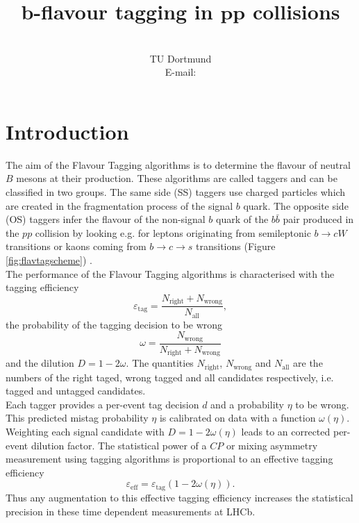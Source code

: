 \documentclass{PoS}
\title{$\bm{b}$-flavour tagging in $\bm{p\!p}$ collisions}
\author{\speaker{Alex Birnkraut}\\%
        TU Dortmund\\
        E-mail: \email{a.birnkraut@cern.ch}}
\begin{document}
\section{Introduction}\label{sec:1}

The aim of the Flavour Tagging algorithms is to determine the flavour of neutral $B$ mesons at their production. These algorithms are called taggers and can be classified in two groups. The same side (SS) taggers use charged particles which are created in the fragmentation process of the signal $b$ quark. The opposite side (OS) taggers infer the flavour of the non-signal $b$ quark of the $b\bar{b}$ pair produced in the $p\!p$ collision by looking e.g. for leptons originating from semileptonic $b\to cW$ transitions or kaons coming from $b\to c\to s$ transitions (Figure \ref{fig:flavtagscheme}) \cite{1}.\\
The performance of the Flavour Tagging algorithms is characterised with the tagging efficiency
\begin{equation}
\varepsilon_\text{tag}=\frac{N_\text{right}+N_\text{wrong}}{N_\text{all}},
\end{equation}
the probability of the tagging decision to be wrong
\begin{equation}
\omega=\frac{N_\text{wrong}}{N_\text{right}+N_\text{wrong}}
\end{equation}
and the dilution $D=1-2\omega$. The quantities $N_\text{right}$, $N_\text{wrong}$ and $N_\text{all}$ are the numbers of the right taged, wrong tagged and all candidates respectively, i.e. tagged and untagged candidates.\\ 
Each tagger provides a per-event tag decision $d$ and a probability $\eta$ to be wrong. This predicted mistag probability $\eta$ is calibrated on data with a function $\omega(\eta)$. Weighting each signal candidate with $D=1-2\omega(\eta)$ leads to an corrected per-event dilution factor. The statistical power of a $C\!P$ or mixing asymmetry measurement using tagging algorithms is proportional to an effective tagging efficiency
\begin{equation}
\varepsilon_\text{eff}= \varepsilon_\text{tag}\left(1-2\omega(\eta)\right).
\end{equation}
Thus any augmentation to this effective tagging efficiency increases the statistical precision in these time dependent measurements at LHCb.
\end{document}
